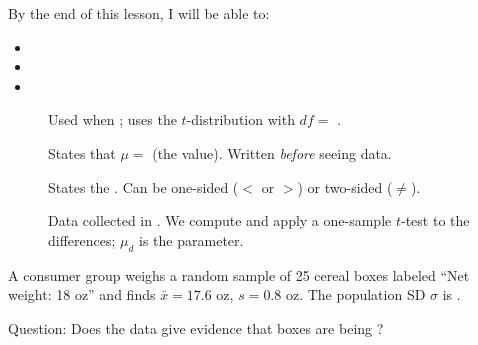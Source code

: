 \documentclass[10pt]{article}
\begin{document}
\namedateperiod

\vspace{0.15in}

\begin{objectivebox}
By the end of this lesson, I will be able to:
\begin{itemize}
  \item {}
  \item {}
  \item {}
\end{itemize}
\end{objectivebox}

\begin{vocabbox}
\begin{description}
  \item[]
        Used when ; uses the $t$-distribution with $df = $ .
  \item[]
        States that $\mu = $  (the  value). Written \emph{before} seeing data.
  \item[]
        States the . Can be one-sided ($<$ or $>$) or two-sided ($\ne$).
  \item[]
        Data collected in . We compute  and apply a one-sample $t$-test to the differences; $\mu_d$ is
        the parameter.
\end{description}
\end{vocabbox}

\begin{hookbox}
A consumer group weighs a random sample of 25 cereal boxes labeled ``Net weight: 18 oz'' and
finds $\bar x = 17.6$ oz, $s = 0.8$ oz. The population SD $\sigma$ is .

Question: Does the data give evidence that boxes are being ?
\end{hookbox}
\end{document}
